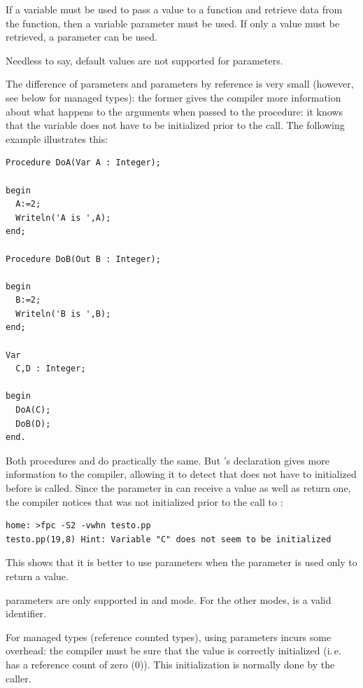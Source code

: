 If a variable must be used to pass a value to a function and retrieve data
from the function, then a variable parameter must be used. If only a value
must be retrieved, a  parameter can be used.

Needless to say, default values are not supported for  parameters.

The difference of  parameters and parameters by reference is very small
(however, see below for managed types):
the former gives the compiler more information about what happens to the
arguments when passed to the procedure: it knows that the variable does not
have to be initialized prior to the call. The following example illustrates
this:
\begin{verbatim}
Procedure DoA(Var A : Integer);

begin
  A:=2;
  Writeln('A is ',A);
end;

Procedure DoB(Out B : Integer);

begin
  B:=2;
  Writeln('B is ',B);
end;

Var
  C,D : Integer;

begin
  DoA(C);
  DoB(D);
end.
\end{verbatim}
Both procedures  and  do practically the same. But
's declaration gives more information to the compiler, allowing
it to detect that  does not have to initialized before 
is called. Since the parameter  in  can receive a value as
well as return one, the compiler notices that  was not initialized
prior to the call to :
\begin{verbatim}
home: >fpc -S2 -vwhn testo.pp
testo.pp(19,8) Hint: Variable "C" does not seem to be initialized
\end{verbatim}
This shows that it is better to use  parameters when the parameter
is used only to return a value.

\begin{remark}
 parameters are only supported in  and  mode. For the other
modes,  is a valid identifier.
\end{remark}

\begin{remark}
For managed types (reference counted types), using  parameters incurs some overhead:
the compiler must be sure that the value is correctly initialized (i.\,e. has a reference count
of zero (0)). This initialization is normally done by the caller.
\end{remark}



